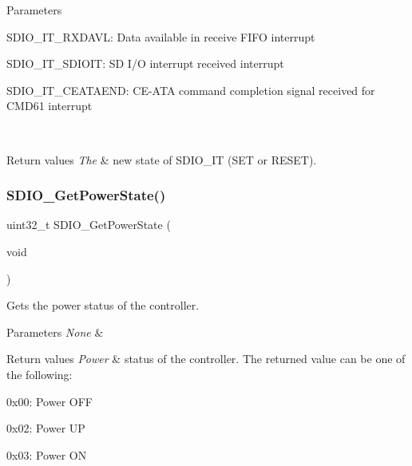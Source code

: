 \begin{DoxyParams}{Parameters}
\begin{DoxyItemize}
S\+D\+I\+O\+\_\+\+I\+T\+\_\+\+R\+X\+D\+A\+VL\+: Data available in receive F\+I\+FO interrupt \item S\+D\+I\+O\+\_\+\+I\+T\+\_\+\+S\+D\+I\+O\+IT\+: SD I/O interrupt received interrupt \item S\+D\+I\+O\+\_\+\+I\+T\+\_\+\+C\+E\+A\+T\+A\+E\+ND\+: C\+E-\/\+A\+TA command completion signal received for C\+M\+D61 interrupt \end{DoxyItemize}
\\
\hline
\end{DoxyParams}

\begin{DoxyRetVals}{Return values}
{\em The} & new state of S\+D\+I\+O\+\_\+\+IT (S\+ET or R\+E\+S\+ET). \\
\hline
\end{DoxyRetVals}
\mbox{\label{group___s_d_i_o___private___functions_ga3a19de2c7cd51645702213f64a1758ed}} 
\subsubsection{\texorpdfstring{SDIO\_GetPowerState()}{SDIO\_GetPowerState()}}
{\footnotesize\ttfamily uint32\+\_\+t S\+D\+I\+O\+\_\+\+Get\+Power\+State (\begin{DoxyParamCaption}\item[{void}]{ }\end{DoxyParamCaption})}



Gets the power status of the controller. 


\begin{DoxyParams}{Parameters}
{\em None} & \\
\hline
\end{DoxyParams}

\begin{DoxyRetVals}{Return values}
{\em Power} & status of the controller. The returned value can be one of the following\+:
\begin{DoxyItemize}
\item 0x00\+: Power O\+FF
\item 0x02\+: Power UP
\item 0x03\+: Power ON 
\end{DoxyItemize}\\
\hline
\end{DoxyRetVals}
\mbox{\label{group___s_d_i_o___private___functions_ga5c1e859511840e8cca6a9a768bce220b}} 
